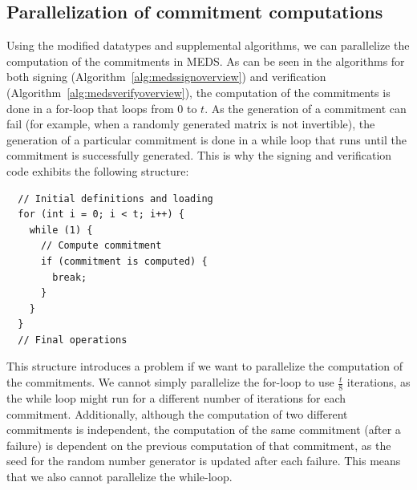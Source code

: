 \documentclass[11pt,a4paper]{report}
\theoremstyle{definition}
\begin{document}
\subsection{Parallelization of commitment computations}
\label{sec:commitmentparallelization}
Using the modified datatypes and supplemental algorithms, we can parallelize the computation of the commitments in MEDS. As can be seen in the algorithms for both signing (Algorithm~\ref{alg:medssignoverview}) and verification (Algorithm~\ref{alg:medsverifyoverview}), the computation of the commitments is done in a for-loop that loops from $0$ to $t$. As the generation of a commitment can fail (for example, when a randomly generated matrix is not invertible), the generation of a particular commitment is done in a while loop that runs until the commitment is successfully generated. This is why the signing and verification code exhibits the following structure:
\begin{samepage}
  \begin{verbatim}
  // Initial definitions and loading
  for (int i = 0; i < t; i++) {
    while (1) {
      // Compute commitment
      if (commitment is computed) {
        break;
      }
    }
  }
  // Final operations
\end{verbatim}
\end{samepage}
This structure introduces a problem if we want to parallelize the computation of the commitments. We cannot simply parallelize the for-loop to use $\frac{t}{8}$ iterations, as the while loop might run for a different number of iterations for each commitment. Additionally, although the computation of two different commitments is independent, the computation of the same commitment (after a failure) is dependent on the previous computation of that commitment, as the seed for the random number generator is updated after each failure. This means that we also cannot parallelize the while-loop.
\end{document}
